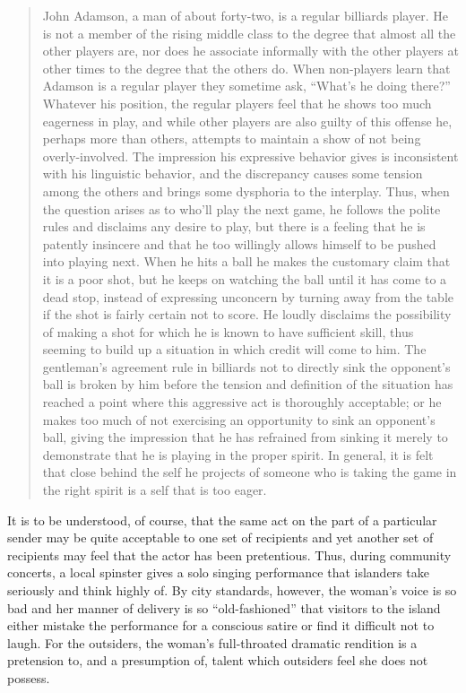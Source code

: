 \documentclass[openany,nobib]{tufte-book}
\begin{document}
\begin{quote}
John Adamson, a man of about forty-two, is a regular billiards player.
He is not a member of the rising middle class to the degree that almost
all the other players are, nor does he associate informally with the
other players at other times to the degree that the others do. When
non-players learn that Adamson is a regular player they sometime ask,
``What's he doing there?'' Whatever his position, the regular players
feel that he shows too much eagerness in play, and while other players
are also guilty of this offense he, perhaps more than others, attempts
to maintain a show of not being overly-involved. The impression his
expressive behavior gives is inconsistent with his linguistic behavior,
and the discrepancy causes some tension among the others and brings some
dysphoria to the interplay. Thus, when the question arises as to who'll
play the next game, he follows the polite rules and disclaims any desire
to play, but there is a feeling that he is patently insincere and that
he too willingly allows himself to be pushed into playing next. When he
hits a ball he makes the customary claim that it is a poor shot, but he
keeps on watching the ball until it has come to a dead stop, instead of
expressing unconcern by turning away from the table if the shot is
fairly certain not to score. He loudly disclaims the possibility of
making a shot for which he is known to have sufficient skill, thus
seeming to build up a situation in which credit will come to him. The
gentleman's agreement rule in billiards not to directly sink the
opponent's ball is broken by him before the tension and definition of
the situation has reached a point where this aggressive act is
thoroughly acceptable; or he makes too much of not exercising an
opportunity to sink an opponent's ball, giving the impression that he
has refrained from sinking it merely to demonstrate that he is playing
in the proper spirit. In general, it is felt that close behind the self
he projects of someone who is taking the game in the right spirit is a
self that is too eager.
\end{quote}

\noindent It is to be understood, of course, that the same act on the part of a
particular sender may be quite acceptable to one set of recipients and
yet another set of recipients may feel that the actor has been
pretentious. Thus, during community concerts, a local spinster gives a
solo singing performance that islanders take seriously and think highly
of. By city standards, however, the woman's voice is so bad and her
manner of delivery is so ``old-fashioned'' that visitors to the island
either mistake the performance for a conscious satire or find it
difficult not to laugh. For the outsiders, the woman's full-throated
dramatic rendition is a pretension to, and a presumption of, talent
which outsiders feel she does not possess.
\end{document}
